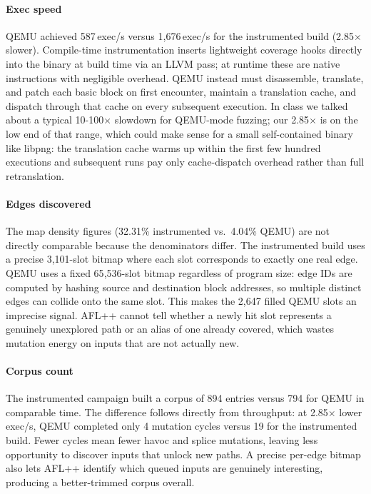     \paragraph{Exec speed}
    QEMU achieved 587\,exec/s versus 1{,}676\,exec/s for the instrumented
    build (2.85$\times$ slower). Compile-time instrumentation inserts
    lightweight coverage hooks directly into the binary at build time via
    an LLVM pass; at runtime these are native instructions with negligible overhead. QEMU instead must disassemble, translate, and patch each
    basic block on first encounter, maintain a translation cache, and
    dispatch through that cache on every subsequent execution. In class we talked about a typical 10-100$\times$ slowdown for QEMU-mode fuzzing; 
    our 2.85$\times$ is on the low end of that range, which could make sense
    for a small self-contained binary like libpng: the translation cache
    warms up within the first few hundred executions and subsequent runs
    pay only cache-dispatch overhead rather than full retranslation.
\vspace{-12pt}
    \paragraph{Edges discovered}
    The map density figures (32.31\% instrumented vs.\ 4.04\% QEMU) are
    not directly comparable because the denominators differ. The instrumented build uses a precise 3{,}101-slot bitmap where each slot
    corresponds to exactly one real edge. QEMU uses a fixed 65{,}536-slot
    bitmap regardless of program size: edge IDs are computed by hashing
    source and destination block addresses, so multiple distinct edges can collide onto the same slot. This makes the 2{,}647 filled QEMU slots an imprecise signal. AFL++ cannot tell whether a newly hit slot represents a genuinely unexplored path or an alias of one already covered, which wastes mutation energy on inputs that are not actually new.
\vspace{-12pt}
    \paragraph{Corpus count} The instrumented campaign built a corpus of 894 entries versus 794 for QEMU in comparable time. The difference follows directly from throughput: at 2.85$\times$ lower exec/s, QEMU completed only 4 mutation cycles versus 19 for the instrumented build. Fewer cycles mean fewer havoc and splice mutations, leaving less opportunity to discover inputs that unlock new paths. A precise per-edge bitmap also lets AFL++ identify which queued inputs are genuinely interesting, producing a better-trimmed corpus overall.
\vspace{-10pt}
